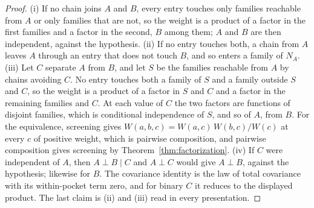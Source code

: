 \documentclass[11pt]{article}
\begin{document}
\begin{proof}
(i) If no chain joins $A$ and $B$, every entry touches only families reachable from $A$ or only families that are not, so the weight is a product of a factor in the first families and a factor in the second, $B$ among them; $A$ and $B$ are then independent, against the hypothesis. (ii) If no entry touches both, a chain from $A$ leaves $A$ through an entry that does not touch $B$, and so enters a family of $N_A$. (iii) Let $C$ separate $A$ from $B$, and let $S$ be the families reachable from $A$ by chains avoiding $C$. No entry touches both a family of $S$ and a family outside $S$ and $C$, so the weight is a product of a factor in $S$ and $C$ and a factor in the remaining families and $C$. At each value of $C$ the two factors are functions of disjoint families, which is conditional independence of $S$, and so of $A$, from $B$. For the equivalence, screening gives $W(a,b,c) = W(a,c)\, W(b,c) / W(c)$ at every $c$ of positive weight, which is pairwise composition, and pairwise composition gives screening by Theorem~\ref{thm:factorization}. (iv) If $C$ were independent of $A$, then $A \perp B \mid C$ and $A \perp C$ would give $A \perp B$, against the hypothesis; likewise for $B$. The covariance identity is the law of total covariance with its within-pocket term zero, and for binary $C$ it reduces to the displayed product. The last claim is (ii) and (iii) read in every presentation.
\end{proof}
\end{document}
